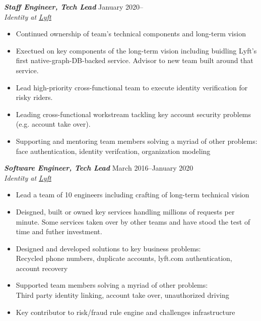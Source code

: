 \documentclass[line,letterpaper]{resume}
\begin{document}
\begin{resume}
    {\sl\textbf{Staff Engineer, Tech Lead}} \hfill January 2020--\\
    \emph{Identity at \underline{\href{https://www.lyft.com/}{Lyft}}}
    \begin{itemize}
        \item Continued ownership of team's technical components and long-term
            vision
        \item Exectued on key components of the long-term vision including
            buidling Lyft's first native-graph-DB-backed service. Advisor to new
            team built around that service.
        \item Lead high-priority cross-functional team to execute identity
            verification for risky riders.
        \item Leading cross-functional workstream tackling key account security
            problems (e.g. account take over).
        \item Supporting and mentoring team members solving a myriad of other
            problems: face authentication, identity verifcation, organization modeling
    \end{itemize}
    \vspace{-6pt}

    {\sl\textbf{Software Engineer, Tech Lead}} \hfill March 2016--January 2020\\
    \emph{Identity at \underline{\href{https://www.lyft.com/}{Lyft}}}
    \begin{itemize}
        \item Lead a team of 10 engineers including crafting of long-term technical vision
        \item Deisgned, built or owned key services handling millions of
            requests per minute. Some services taken over by other teams and
            have stood the test of time and futher investment.
        \item Designed and developed solutions to key business problems: \\
            Recycled phone numbers, duplicate accounts, lyft.com authentication,
            account recovery
        \item Supported team members solving a myriad of other problems: \\
            Third party identity linking, account take over, unauthorized driving
        \item Key contributor to risk/fraud rule engine and challenges infrastructure
    \end{itemize}
    \vspace{-6pt}


\end{resume}
\end{document}

